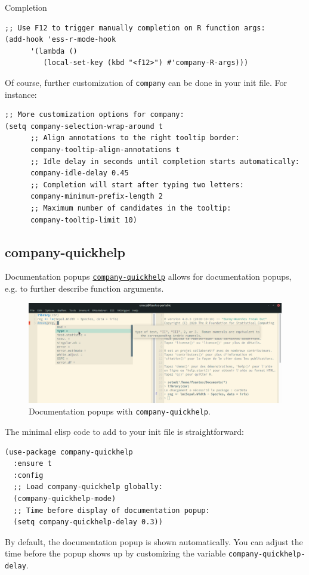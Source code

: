 \documentclass[presentation]{beamer}
\begin{document}
\begin{frame}[fragile,allowframebreaks,label=]{Completion}
\begin{verbatim}
;; Use F12 to trigger manually completion on R function args:
(add-hook 'ess-r-mode-hook
	  '(lambda ()
	     (local-set-key (kbd "<f12>") #'company-R-args)))
\end{verbatim}

\pagebreak

Of course, further customization of \texttt{company} can be done in your init file. For instance:

\begin{verbatim}
;; More customization options for company:
(setq company-selection-wrap-around t
      ;; Align annotations to the right tooltip border:
      company-tooltip-align-annotations t
      ;; Idle delay in seconds until completion starts automatically:
      company-idle-delay 0.45
      ;; Completion will start after typing two letters:
      company-minimum-prefix-length 2
      ;; Maximum number of candidates in the tooltip:
      company-tooltip-limit 10)
\end{verbatim}
\end{frame}

\subsection{company-quickhelp}
\label{sec:org10a5a8d}
\begin{frame}[fragile,allowframebreaks,label=]{Documentation popups}
 \href{https://github.com/company-mode/company-quickhelp}{\texttt{company-quickhelp}} allows for documentation popups, e.g. to further describe function arguments.

\begin{figure}[htbp]
\centering
\includegraphics[width=\textwidth]{./images/company-quickhelp.png}
\caption{Documentation popups with \texttt{company-quickhelp}.}
\end{figure}

The minimal elisp code to add to your init file is straightforward:

\begin{verbatim}
(use-package company-quickhelp
  :ensure t
  :config
  ;; Load company-quickhelp globally:
  (company-quickhelp-mode)
  ;; Time before display of documentation popup:
  (setq company-quickhelp-delay 0.3))
\end{verbatim}

By default, the documentation popup is shown automatically. You can adjust the time before the popup shows up by customizing the variable \texttt{company-quickhelp-delay}.
\end{frame}
\end{document}
